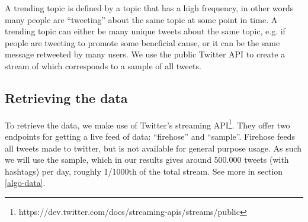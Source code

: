 A trending topic is defined by a topic that has a high frequency, in other words many people are ``tweeting'' about the same topic at some point in time. A trending topic can either be many unique tweets about the same topic, e.g. if people are tweeting to promote some beneficial cause, or it can be the same message retweeted by many users. We use the public Twitter API to create a stream of which corresponds to a sample of all tweets. 

\subsection{Retrieving the data}
To retrieve the data, we make use of Twitter's streaming API\footnote{https://dev.twitter.com/docs/streaming-apis/streams/public}. They offer two endpoints for getting a live feed of data: ``firehose'' and ``sample''. Firehose feeds all tweets made to twitter, but is not available for general purpose usage. As such we will use the sample, which in our results gives around 500.000 tweets (with hashtags) per day, roughly 1/1000th of the total stream. See more in section \ref{algo-data}.
